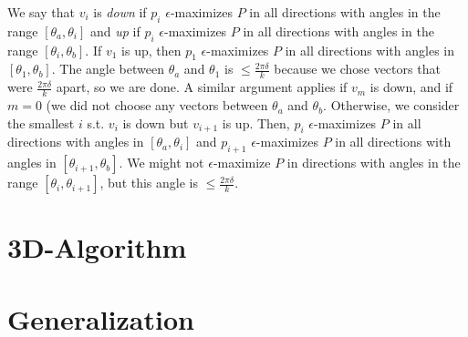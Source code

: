 \documentclass[12pt]{article}
\theoremstyle{definition}
\theoremstyle{lemma}
\theoremstyle{theorem}
\begin{document}
We say that $v_i$ is \emph{down} if $p_i$ $\epsilon$-maximizes $P$ in all directions with angles in the range $[\theta_a, \theta_i]$ and \emph{up} if $p_i$ $\epsilon$-maximizes $P$ in all directions with angles in the range $[\theta_i, \theta_b]$. If $v_1$ is up, then $p_1$ $\epsilon$-maximizes $P$ in all directions with angles in $[\theta_1, \theta_b]$. The angle between $\theta_a$ and $\theta_1$ is $\leq \frac{2\pi\delta}{k}$ because we chose vectors that were $\frac{2\pi\delta}{k}$ apart, so we are done. A similar argument applies if $v_m$ is down, and if $m = 0$ (we did not choose any vectors between $\theta_a$ and $\theta_b$. Otherwise, we consider the smallest $i$ s.t. $v_i$ is down but $v_{i+1}$ is up. Then, $p_i$ $\epsilon$-maximizes $P$ in all directions with angles in $[\theta_a, \theta_i]$ and $p_{i+1}$ $\epsilon$-maximizes $P$ in all directions with angles in $[\theta_{i+1}, \theta_b]$. We might not $\epsilon$-maximize $P$ in directions with angles in the range $[\theta_i, \theta_{i+1}]$, but this angle is $\leq \frac{2\pi\delta}{k}$.


\section{3D-Algorithm}

\section{Generalization}
\end{document}
